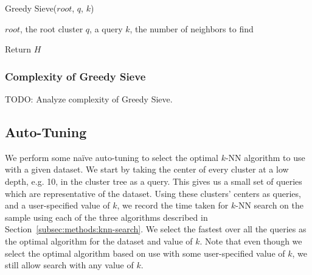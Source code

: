 \begin{algorithm} 
\caption{Greedy Sieve($root$, $q$, $k$)} 
\label{alg:methods:greedy-sieve} 
\begin{algorithmic}
    \REQUIRE $root$, the root cluster
    \REQUIRE $q$, a query
    \REQUIRE $k$, the number of neighbors to find


        \ENDWHILE
        \ENDFOR
        \ENDWHILE
    \ENDWHILE
    \STATE Return $H$
\end{algorithmic}
\end{algorithm}


\subsubsection{Complexity of Greedy Sieve}
\label{paragraph:methods:greedy-sieve-complexity}

TODO: Analyze complexity of Greedy Sieve.


\subsection {Auto-Tuning}
\label{subsec:methods:auto-tuning}

We perform some na\"{i}ve auto-tuning to select the optimal $k$-NN algorithm to use with a given dataset.
We start by taking the center of every cluster at a low depth, e.g. 10, in the cluster tree as a query.
This gives us a small set of queries which are representative of the dataset.
Using these clusters' centers as queries, and a user-specified value of $k$, we record the time taken for $k$-NN search on the sample using each of the three algorithms described in Section~\ref{subsec:methods:knn-search}.
We select the fastest over all the queries as the optimal algorithm for the dataset and value of $k$.
Note that even though we select the optimal algorithm based on use with some user-specified value of $k$, we still allow search with any value of $k$.


